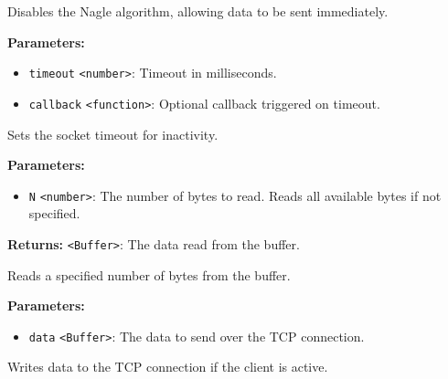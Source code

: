\documentclass[12pt,a4paper]{article}
\begin{document}
\noindent Disables the Nagle algorithm, allowing data to be sent immediately.

\vspace{5mm}
\noindent {}


\noindent \textbf{Parameters:}
\begin{itemize}
  \item \texttt{timeout} \texttt{<number>}: Timeout in milliseconds.
  \item \texttt{callback} \texttt{<function>}: Optional callback triggered on timeout.
\end{itemize}

\noindent Sets the socket timeout for inactivity.

\vspace{5mm}
\noindent {}


\noindent \textbf{Parameters:}
\begin{itemize}
  \item \texttt{N} \texttt{<number>}: The number of bytes to read. Reads all available bytes if not specified.
\end{itemize}

\noindent \textbf{Returns:} \texttt{<Buffer>}: The data read from the buffer.

\noindent Reads a specified number of bytes from the buffer.

\vspace{5mm}
\noindent {}


\noindent \textbf{Parameters:}
\begin{itemize}
  \item \texttt{data} \texttt{<Buffer>}: The data to send over the TCP connection.
\end{itemize}

\noindent Writes data to the TCP connection if the client is active.

\vspace{5mm}
\noindent {}
\end{document}
